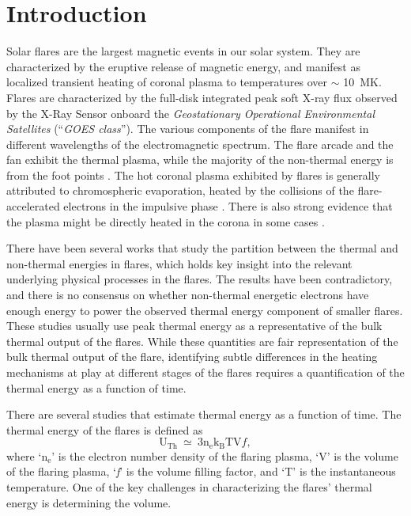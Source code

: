\justifying

\section{Introduction} \label{sec:intro}

Solar flares are the largest magnetic events in our solar system. They are characterized by the eruptive release of magnetic energy, and manifest as localized transient heating of coronal plasma to temperatures over $\sim$ 10~MK. Flares are characterized by the full-disk integrated peak soft X-ray flux observed by the X-Ray Sensor onboard the {\it Geostationary Operational Environmental Satellites} \citep[{\it GOES}/XRS,][]{xrs} (``\textit{GOES class}''). The various components of the flare manifest in different wavelengths of the electromagnetic spectrum. The flare arcade and the fan exhibit the thermal plasma, while the majority of the non-thermal energy is from the foot points \citep{benz17}. The hot coronal plasma exhibited by flares is generally attributed to chromospheric evaporation, heated by the collisions of the flare-accelerated electrons in the impulsive phase \citep{fletcher11}. There is also strong evidence that the plasma might be directly heated in the corona in some cases \citep[e.g.][]{longcope11, reeves17}. 

There have been several works \citep{stosire07,emslie12,inglis14,warmuth16a,warmuth16b,ash17} that study the partition between the thermal and non-thermal energies in flares, which holds key insight into the relevant underlying physical processes in the flares. The results have been contradictory, and there is no consensus on whether non-thermal energetic electrons have enough energy to power the observed thermal energy component of smaller flares. These studies usually use peak thermal energy as a representative of the bulk thermal output of the flares. While these quantities are fair representation of the bulk thermal output of the flare, identifying subtle differences in the heating mechanisms at play at different stages of the flares requires a quantification of the thermal energy as a function of time.

There are several studies \citep{hilarie05,caspi10} that estimate thermal energy as a function of time. The thermal energy of the flares is defined as 
\begin{equation}
\mathrm{U_{Th}~\simeq~3n_{e}k_{B}TV}f,
\end{equation} \label{eq:t_eneg_1}
 where `$\mathrm{n_{e}}$' is the electron number density of the flaring plasma, `V' is the volume of the flaring plasma, `\textit{f}' is the volume filling factor, and `T' is the instantaneous temperature. One of the key challenges in characterizing the flares' thermal energy is determining the volume. 

